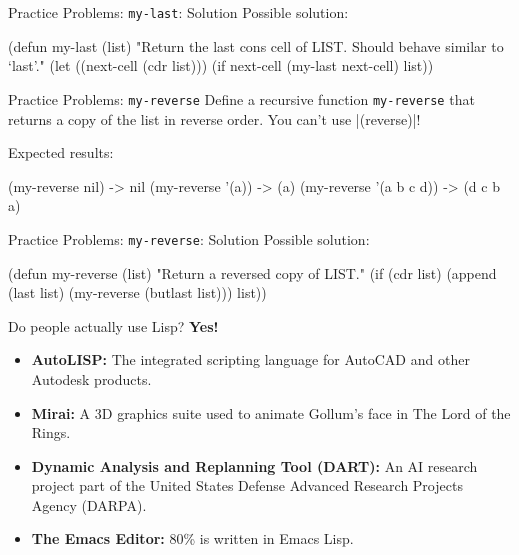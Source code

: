 \documentclass{beamer}
\begin{document}

\begin{frame}[fragile]{Practice Problems: \texttt{my-last}: Solution}
  Possible solution:
  \begin{clcode}
(defun my-last (list)
  "Return the last cons cell of LIST.
Should behave similar to `last'."
  (let ((next-cell (cdr list)))
    (if next-cell
        (my-last next-cell)
      list))
  \end{clcode}
\end{frame}

\begin{frame}[fragile]{Practice Problems: \texttt{my-reverse}}
  Define a recursive function \texttt{my-reverse} that returns a copy
  of the list in reverse order. You can't use \cl|(reverse)|!

Expected results:
\begin{clcode}
  (my-reverse nil) -> nil
  (my-reverse '(a)) -> (a)
  (my-reverse '(a b c d)) -> (d c b a)
\end{clcode}
\end{frame}

\begin{frame}[fragile]{Practice Problems: \texttt{my-reverse}: Solution}
  Possible solution:
  \begin{clcode}
(defun my-reverse (list)
  "Return a reversed copy of LIST."
  (if (cdr list)
      (append (last list) (my-reverse (butlast list)))
    list))
  \end{clcode}
\end{frame}

\begin{frame}{Do people actually use Lisp?}
  \textbf{Yes!}
  \begin{itemize}
  \item \textbf{AutoLISP:} The integrated scripting language for AutoCAD and
    other Autodesk products.
  \item \textbf{Mirai:} A 3D graphics suite used to animate Gollum's face in The Lord of the Rings.
  \item \textbf{Dynamic Analysis and Replanning Tool (DART):} An AI research
    project part of the United States Defense Advanced Research
    Projects Agency (DARPA).
  \item \textbf{The Emacs Editor:} 80\% is written in Emacs Lisp.
  \end{itemize}
\end{frame}
\end{document}

